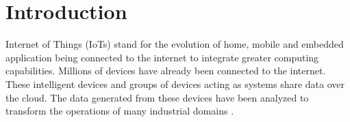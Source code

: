 \chapter{Introduction}

\label{sec:introduction}
Internet of Things (IoTs) stand for the evolution of home, mobile and embedded application being connected to the internet to integrate greater computing capabilities. Millions of devices have already been connected to the internet. These intelligent devices and groups of devices acting as systems share data over the cloud. The data generated from these devices have been analyzed to transform the operations of many industrial domains  \cite{zeinab2017internet}. 


